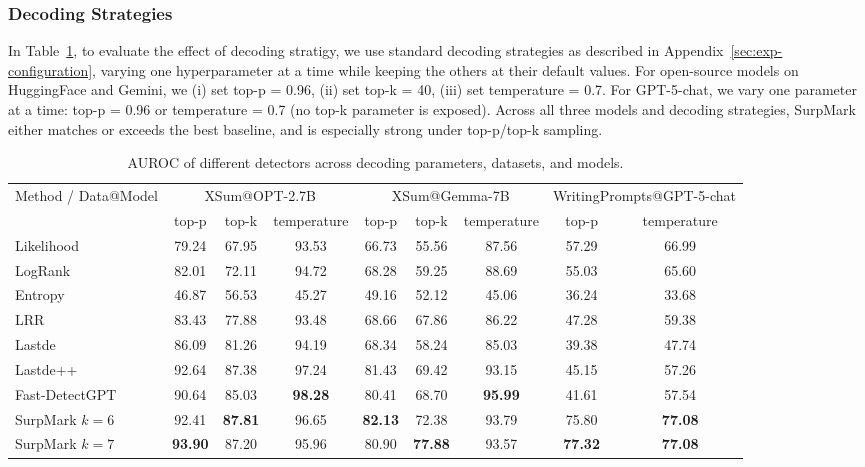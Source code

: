 \documentclass{article}
\theoremstyle{plain}
\theoremstyle{definition}
\theoremstyle{remark}
\begin{document}
\subsubsection{Decoding Strategies} \label{app:decoding}
In Table~\ref{tab:method-decoding}, to evaluate the effect of decoding stratigy, we use standard decoding strategies as described in Appendix~\ref{sec:exp-configuration}, varying one hyperparameter at a time while keeping the others at their default values. For open-source models on HuggingFace and Gemini, we (i) set top-p = 0.96, (ii) set top-k = 40, (iii) set temperature = 0.7. For GPT-5-chat, we vary one parameter at a time: top-p = 0.96 or temperature = 0.7 (no top-k parameter is exposed). Across all three models and decoding strategies, SurpMark either matches or exceeds the best baseline, and is especially strong under top-p/top-k sampling.
\begin{table}[htbp]
\centering
{\scriptsize
\begin{tabular}{l c c c c c c c c}
\toprule
\multirow{2}{*}{Method / Data@Model} 
  & \multicolumn{3}{c}{XSum@OPT-2.7B} 
  & \multicolumn{3}{c}{XSum@Gemma-7B} 
  & \multicolumn{2}{c}{WritingPrompts@GPT-5-chat} \\

    
  & top-p & top-k & temperature 
  & top-p & top-k & temperature 
  & top-p & temperature \\
\midrule
Likelihood     
  & 79.24 & 67.95 & 93.53
  & 66.73 & 55.56 & 87.56
  & 57.29 & 66.99 \\
LogRank        
  & 82.01 & 72.11 & 94.72
  & 68.28 & 59.25 & 88.69
  & 55.03 & 65.60 \\
Entropy        
  & 46.87 & 56.53 & 45.27
  & 49.16 & 52.12 & 45.06
  & 36.24 & 33.68 \\
LRR            
  & 83.43 & 77.88 & 93.48
  & 68.66 & 67.86 & 86.22
  & 47.28 & 59.38 \\
Lastde         
  & 86.09 & 81.26 & 94.19
  & 68.34 & 58.24 & 85.03
  & 39.38 & 47.74 \\
Lastde++       
  & 92.64 & 87.38 & 97.24
  & 81.43 & 69.42 & 93.15
  & 45.15 & 57.26 \\
Fast-DetectGPT 
  & 90.64 & 85.03 & \textbf{98.28}
  & 80.41 & 68.70 & \textbf{95.99}
  & 41.61 & 57.54 \\
SurpMark $k=6$ 
  & 92.41 & \textbf{87.81} & 96.65
  & \textbf{82.13} & 72.38 & 93.79
  & 75.80 & \textbf{77.08} \\
SurpMark $k=7$ 
  & \textbf{93.90} & 87.20 & 95.96
  & 80.90 & \textbf{77.88} & 93.57
  & \textbf{77.32} & \textbf{77.08} \\
\bottomrule
\end{tabular}}
\caption{AUROC of different detectors across decoding parameters, datasets, and models.}
\label{tab:method-decoding}
\end{table}
\end{document}
